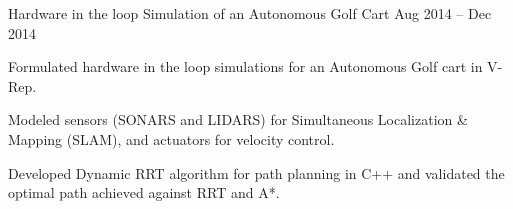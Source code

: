 \begin{cventries}
  \cvprojectentry
    {Hardware in the loop Simulation of an Autonomous Golf Cart} %
    {Aug 2014 – Dec 2014} %
    {
      \begin{cvitems} %
        \item {Formulated hardware in the loop simulations for an Autonomous Golf cart in V-Rep.}
        \item {Modeled sensors (SONARS and LIDARS) for Simultaneous Localization \& Mapping (SLAM), and actuators for velocity control.}
        \item {Developed Dynamic RRT algorithm for path planning in C++ and validated the optimal path achieved against RRT and A*.}
      \end{cvitems}
    }

\end{cventries}
